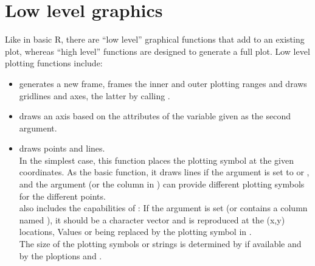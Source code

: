 \documentclass[11pt]{article}\usepackage[]{graphicx}\usepackage[]{color}
\begin{document}
\section{Low level graphics}

Like in basic R, there are ``low level'' graphical functions that
add to an existing plot, whereas ``high level'' functions are designed to 
generate a full plot. Low level plotting functions include:

\begin{itemize}
\item 
   generates a new frame, frames the inner and outer plotting
  ranges and draws gridlines and axes, the latter by calling . 
\item
   draws an axis based on the attributes of the variable given as
  the second argument.   
\item
{} draws points and lines. \\
  In the simplest case, this function places the plotting symbol at the
  given coordinates. As the basic  function, it draws lines if 
  the argument  is set to  or , and the argument
   (or the column  in ) can provide
  different plotting symbols for the different points.\\

   also includes the capabilities of : 
  If the argument  
  is set (or  contains a column named ),
  it should be a character vector and is reproduced at the (x,y) locations,
  Values  or  being replaced by the plotting symbol in .\\
  The size of the plotting symbols or strings is determined by
   if available and by the ploptions
   and .


\end{itemize}
\end{document}

